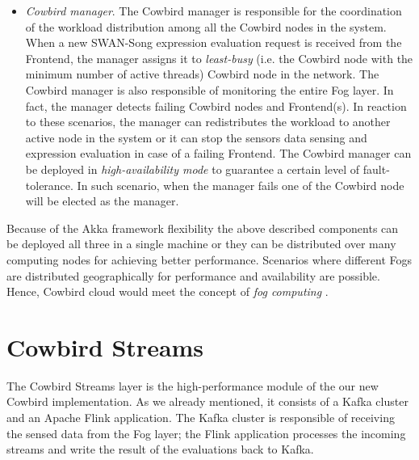 \begin{itemize}
\item \emph{Cowbird manager}. The Cowbird manager is responsible for the coordination of the workload distribution among all the Cowbird nodes in the system. When a new SWAN-Song expression evaluation request is received from the Frontend, the manager assigns it to \emph{least-busy} (i.e. the Cowbird node with the minimum number of active threads) Cowbird node in the network. The Cowbird manager is also responsible of monitoring the entire Fog layer. In fact, the manager detects failing Cowbird nodes and Frontend(s). In reaction to these scenarios, the manager can redistributes the workload to another active node in the system or it can stop the sensors data sensing and expression evaluation in case of a failing Frontend. The Cowbird manager can be deployed in \emph{high-availability mode} to guarantee a certain level of fault-tolerance. In such scenario, when the manager fails one of the Cowbird node will be elected as the manager. 
\end{itemize}

Because of the Akka framework flexibility the above described components can be deployed all three in a single machine or they can be distributed over many computing nodes for achieving better performance. Scenarios where different Fogs are distributed geographically for performance and availability are possible. Hence, Cowbird cloud would meet the concept of \emph{fog computing} \cite{fogcomputingBonomi2012}. 

\section{Cowbird Streams}
The Cowbird Streams layer is the high-performance module of the our new Cowbird implementation. As we already mentioned, it consists of a Kafka cluster and an Apache Flink application. The Kafka cluster is responsible of receiving the sensed data from the Fog layer; the Flink application processes the incoming streams and write the result of the evaluations back to Kafka.

